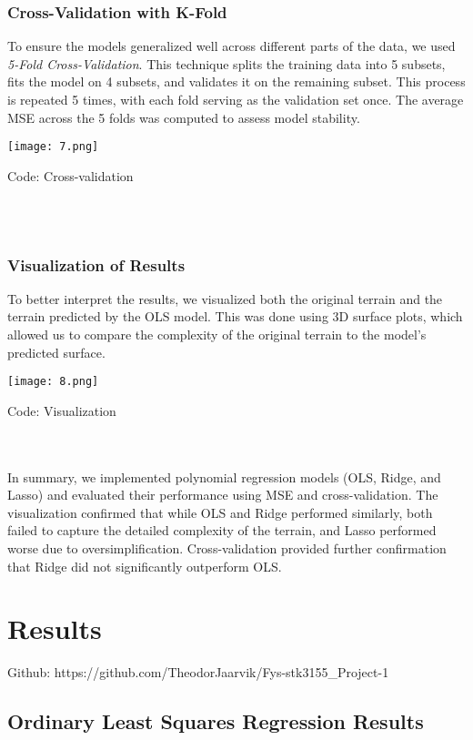 \documentclass{article}
\begin{document}
\begin{enumerate}
\subsubsection{Cross-Validation with K-Fold}

To ensure the models generalized well across different parts of the data, we used \textit{5-Fold Cross-Validation}. This technique splits the training data into 5 subsets, fits the model on 4 subsets, and validates it on the remaining subset. This process is repeated 5 times, with each fold serving as the validation set once. The average MSE across the 5 folds was computed to assess model stability.

\texttt{[image: 7.png]}
\caption{Code: Cross-validation }
\label{fig:enter-label}\\\\


\subsubsection{Visualization of Results}

To better interpret the results, we visualized both the original terrain and the terrain predicted by the OLS model. This was done using 3D surface plots, which allowed us to compare the complexity of the original terrain to the model’s predicted surface.

\texttt{[image: 8.png]}
\caption{Code: Visualization }
\label{fig:enter-label}\\\\

In summary, we implemented polynomial regression models (OLS, Ridge, and Lasso) and evaluated their performance using MSE and cross-validation. The visualization confirmed that while OLS and Ridge performed similarly, both failed to capture the detailed complexity of the terrain, and Lasso performed worse due to oversimplification. Cross-validation provided further confirmation that Ridge did not significantly outperform OLS.



\section{Results}

Github: https://github.com/TheodorJaarvik/Fys-stk3155\_Project-1

\subsection{Ordinary Least Squares Regression Results}



\end{enumerate}
\end{document}
